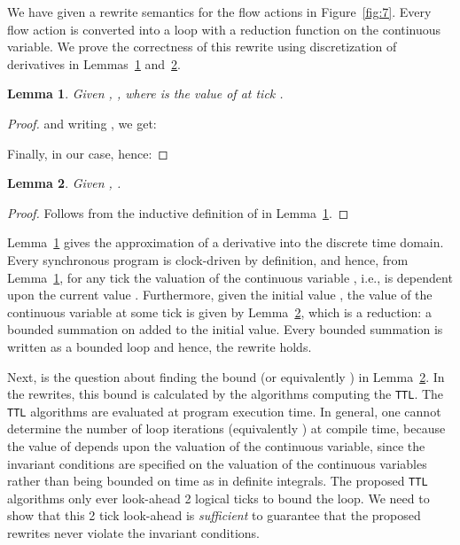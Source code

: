 \documentclass[10pt,journal,cspaper,compsoc]{IEEEtran}
\newtheorem{lem}{Lemma}
\begin{document}
We have given a rewrite semantics for the flow actions in
Figure~\ref{fig:7}. Every flow action is converted into a loop with a
reduction function on the continuous variable. We prove the correctness
of this rewrite using discretization of derivatives in
Lemmas~\ref{lem:1} and~\ref{lem:2}.

\begin{lem}
  Given , , where  is
  the value of  at tick .
 \label{lem:1}
\end{lem}

\begin{proof}
  
   and writing , we
  get:
  
Finally, in our case,  hence:

\end{proof}

\begin{lem}
 Given , . 
 \label{lem:2}
\end{lem}

\begin{proof}
  Follows from the inductive definition of \mbox{} in
  Lemma~\ref{lem:1}.
\end{proof}

Lemma~\ref{lem:1} gives the approximation of a derivative into the
discrete time domain. Every synchronous program is clock-driven by
definition, and hence, from Lemma~\ref{lem:1}, for any tick  the
valuation of the continuous variable , i.e.,  is dependent
upon the current value . Furthermore, given the initial value
, the value of the continuous variable at some tick  is given
by Lemma~\ref{lem:2}, which is a reduction: a bounded summation on  added to the initial value. Every bounded summation is
written as a bounded loop and hence, the rewrite holds.

Next, is the question about finding the bound (or equivalently ) in
Lemma~\ref{lem:2}. In the rewrites, this bound is calculated by the
algorithms computing the \texttt{TTL}. The \texttt{TTL} algorithms are
evaluated at program execution time. In general, one cannot determine
the number of loop iterations (equivalently ) at compile time,
because the value of  depends upon the valuation of the continuous
variable, since the invariant conditions are specified on the valuation
of the continuous variables rather than being bounded on time as in
definite integrals. The proposed \texttt{TTL} algorithms only ever
look-ahead 2 logical ticks to bound the loop. We need to show that this
2 tick look-ahead is \textit{sufficient} to guarantee that the proposed
rewrites never violate the invariant conditions.
\end{document}
